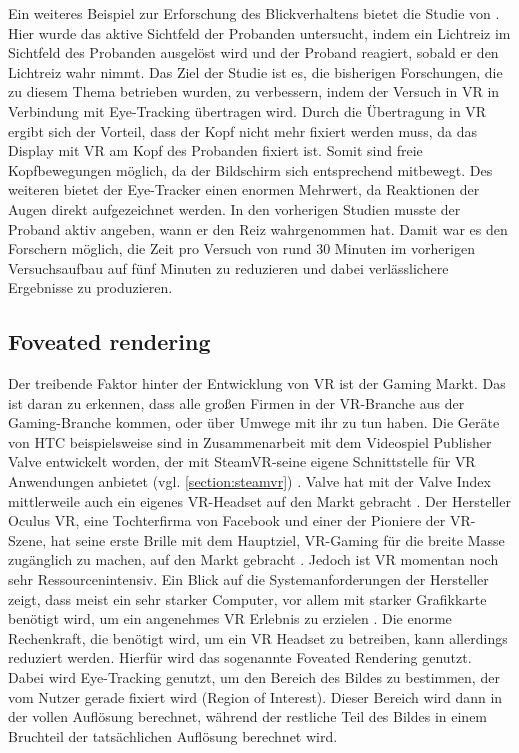 Ein weiteres Beispiel zur Erforschung des Blickverhaltens bietet die Studie von \citeauthor{K.Hotta.2019}. Hier wurde das aktive Sichtfeld der Probanden untersucht, indem ein Lichtreiz im Sichtfeld des Probanden ausgelöst wird und der Proband reagiert, sobald er den Lichtreiz wahr nimmt. Das Ziel der Studie ist es, die bisherigen Forschungen, die zu diesem Thema betrieben wurden, zu verbessern, indem der Versuch in \ac{VR} in Verbindung mit Eye-Tracking übertragen wird. Durch die Übertragung in \ac{VR} ergibt sich der Vorteil, dass der Kopf nicht mehr fixiert werden muss, da das Display mit \ac{VR} am Kopf des Probanden fixiert ist. Somit sind freie Kopfbewegungen möglich, da der Bildschirm sich entsprechend mitbewegt. Des weiteren bietet der Eye-Tracker einen enormen Mehrwert, da Reaktionen der Augen direkt aufgezeichnet werden. In den vorherigen Studien musste der Proband aktiv angeben, wann er den Reiz wahrgenommen hat. Damit war es den Forschern möglich, die Zeit pro Versuch von rund 30 Minuten im vorherigen Versuchsaufbau auf fünf Minuten zu reduzieren und dabei verlässlichere Ergebnisse zu produzieren.\cite{K.Hotta.2019}

\subsection{Foveated rendering}
\label{section:foveated}
Der treibende Faktor hinter der Entwicklung von \ac{VR} ist der Gaming Markt. Das ist daran zu erkennen, dass alle großen Firmen in der \ac{VR}-Branche aus der Gaming-Branche kommen, oder über Umwege mit ihr zu tun haben. Die Geräte von HTC beispielsweise sind in Zusammenarbeit mit dem Videospiel Publisher Valve entwickelt worden, der mit Steam\ac{VR}-seine eigene Schnittstelle für \ac{VR} Anwendungen anbietet (vgl. \autoref{section:steamvr}) \cite{ViveProduct}. Valve hat mit der Valve Index mittlerweile auch ein eigenes \ac{VR}-Headset auf den Markt gebracht \cite{Index}. Der Hersteller Oculus VR, eine Tochterfirma von Facebook und einer der Pioniere der \ac{VR}-Szene, hat seine erste Brille mit dem Hauptziel, \ac{VR}-Gaming für die breite Masse zugänglich zu machen, auf den Markt gebracht \cite{OculusKickstarter}. Jedoch ist \ac{VR} momentan noch sehr Ressourcenintensiv. Ein Blick auf die Systemanforderungen der Hersteller zeigt, dass meist ein sehr starker Computer, vor allem mit starker Grafikkarte benötigt wird, um ein angenehmes \ac{VR} Erlebnis zu erzielen \cite{Lang.2019}. Die enorme Rechenkraft, die benötigt wird, um ein \ac{VR} Headset zu betreiben, kann allerdings reduziert werden. Hierfür wird das sogenannte Foveated Rendering genutzt. Dabei wird Eye-Tracking genutzt, um den Bereich des Bildes zu bestimmen, der vom Nutzer gerade fixiert wird (Region of Interest). Dieser Bereich wird dann in der vollen Auflösung berechnet, während der restliche Teil des Bildes in einem Bruchteil der tatsächlichen Auflösung berechnet wird\cite{Albert.2017}.

